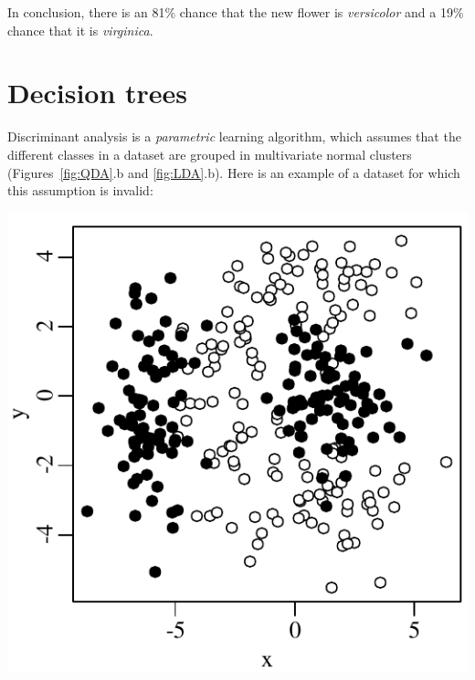 In conclusion, there is an 81\% chance that the new flower is
\emph{versicolor} and a 19\% chance that it is \emph{virginica}.

\section{Decision trees}
\label{sec:CART}

Discriminant analysis is a \textit{parametric} learning algorithm,
which assumes that the different classes in a dataset are grouped in
multivariate normal clusters (Figures~\ref{fig:QDA}.b and
\ref{fig:LDA}.b). Here is an example of a dataset for which this
assumption is invalid:

\noindent\begin{minipage}[t][][b]{.35\textwidth}
\includegraphics[width=\textwidth]{../figures/CARTdata.pdf}\\
\end{minipage}
\begin{minipage}[t][][t]{.65\textwidth}
  \label{fig:CARTdata}
\end{minipage}

